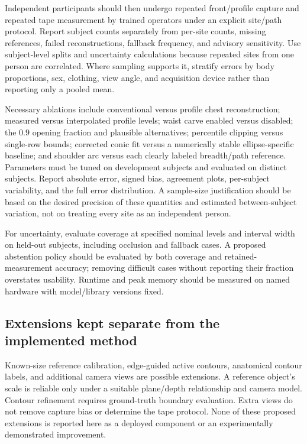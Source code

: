 \documentclass[11pt,a4paper]{article}
\numberwithin{equation}{section}
\begin{document}
Independent participants should then undergo repeated front/profile capture and repeated tape measurement by trained operators under an explicit site/path protocol. Report subject counts separately from per-site counts, missing references, failed reconstructions, fallback frequency, and advisory sensitivity. Use subject-level splits and uncertainty calculations because repeated sites from one person are correlated. Where sampling supports it, stratify errors by body proportions, sex, clothing, view angle, and acquisition device rather than reporting only a pooled mean.

Necessary ablations include conventional versus profile chest reconstruction; measured versus interpolated profile levels; waist carve enabled versus disabled; the $0.9$ opening fraction and plausible alternatives; percentile clipping versus single-row bounds; corrected conic fit versus a numerically stable ellipse-specific baseline; and shoulder arc versus each clearly labeled breadth/path reference. Parameters must be tuned on development subjects and evaluated on distinct subjects. Report absolute error, signed bias, agreement plots, per-subject variability, and the full error distribution. A sample-size justification should be based on the desired precision of these quantities and estimated between-subject variation, not on treating every site as an independent person.

For uncertainty, evaluate coverage at specified nominal levels and interval width on held-out subjects, including occlusion and fallback cases. A proposed abstention policy should be evaluated by both coverage and retained-measurement accuracy; removing difficult cases without reporting their fraction overstates usability. Runtime and peak memory should be measured on named hardware with model/library versions fixed.

\subsection{Extensions kept separate from the implemented method}
Known-size reference calibration, edge-guided active contours, anatomical contour labels, and additional camera views are possible extensions. A reference object's scale is reliable only under a suitable plane/depth relationship and camera model. Contour refinement requires ground-truth boundary evaluation. Extra views do not remove capture bias or determine the tape protocol. None of these proposed extensions is reported here as a deployed component or an experimentally demonstrated improvement.
\end{document}
